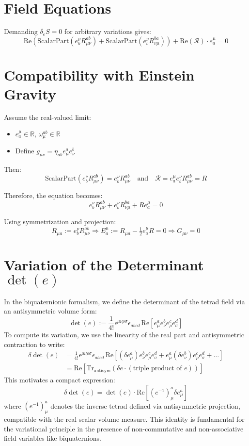 \documentclass[11pt]{article}
\begin{document}
\section{Field Equations}
Demanding \( \delta_e S = 0 \) for arbitrary variations gives:
\[
\boxed{
\text{Re} \left( \text{ScalarPart}(e^\nu_b R_{\mu\nu}^{ab}) + \text{ScalarPart}(e^\nu_b R_{\nu\mu}^{ba}) \right) + \text{Re}(\mathcal{R}) \cdot e^\mu_a = 0
}
\]

\section{Compatibility with Einstein Gravity}

Assume the real-valued limit:
\begin{itemize}
  \item \( e^\mu_a \in \mathbb{R} \), \( \omega_\mu^{ab} \in \mathbb{R} \)
  \item Define \( g_{\mu\nu} = \eta_{ab} e^a_\mu e^b_\nu \)
\end{itemize}

Then:
\[
\text{ScalarPart}(e^\nu_b R_{\mu\nu}^{ab}) = e^\nu_b R_{\mu\nu}^{ab}
\quad \text{and} \quad
\mathcal{R} = e^\mu_a e^\nu_b R_{\mu\nu}^{ab} = R
\]

Therefore, the equation becomes:
\[
e^\nu_b R_{\mu\nu}^{ab} + e^\nu_b R_{\nu\mu}^{ba} + R e^\mu_a = 0
\]

Using symmetrization and projection:
\[
R_{\mu a} := e^\nu_b R_{\mu\nu}^{ab}
\Rightarrow
E^\mu_a := R_{\mu a} - \tfrac{1}{2} e^\mu_a R = 0
\Rightarrow
G_{\mu\nu} = 0
\]


\section{Variation of the Determinant \texorpdfstring{$\det(e)$}{det(e)}}

In the biquaternionic formalism, we define the determinant of the tetrad field via an antisymmetric volume form:
\[
\det(e) := \frac{1}{4!} \epsilon^{\mu\nu\rho\sigma} \epsilon_{abcd} \, \text{Re} \left[ e^a_\mu e^b_\nu e^c_\rho e^d_\sigma \right]
\]
To compute its variation, we use the linearity of the real part and antisymmetric contraction to write:
\begin{align*}
\delta \det(e) &= \frac{1}{4!} \epsilon^{\mu\nu\rho\sigma} \epsilon_{abcd} \, \text{Re} \left[
(\delta e^a_\mu) e^b_\nu e^c_\rho e^d_\sigma + e^a_\mu (\delta e^b_\nu) e^c_\rho e^d_\sigma + \ldots \right] \\
&= \text{Re} \left[ \text{Tr}_{\text{antisym}} \left( \delta e \cdot (\text{triple product of } e) \right) \right]
\end{align*}
This motivates a compact expression:
\[
\boxed{
\delta \det(e) = \det(e) \cdot \text{Re} \left[ (e^{-1})^a_\mu \delta e^a_\mu \right]
}
\]
where \( (e^{-1})^a_\mu \) denotes the inverse tetrad defined via antisymmetric projection, compatible with the real scalar volume measure. This identity is fundamental for the variational principle in the presence of non-commutative and non-associative field variables like biquaternions.
\end{document}
